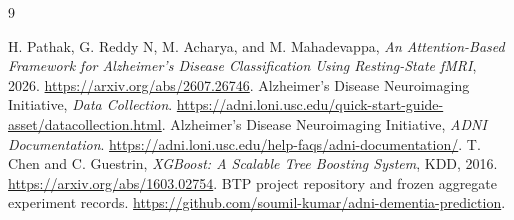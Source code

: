 \documentclass[11pt,a4paper]{article}
\begin{document}
\begin{thebibliography}{9}
 H. Pathak, G. Reddy N, M. Acharya, and M. Mahadevappa, \emph{An Attention-Based Framework for Alzheimer's Disease Classification Using Resting-State fMRI}, 2026. \url{https://arxiv.org/abs/2607.26746}.
 Alzheimer's Disease Neuroimaging Initiative, \emph{Data Collection}. \url{https://adni.loni.usc.edu/quick-start-guide-asset/datacollection.html}.
 Alzheimer's Disease Neuroimaging Initiative, \emph{ADNI Documentation}. \url{https://adni.loni.usc.edu/help-faqs/adni-documentation/}.
 T. Chen and C. Guestrin, \emph{XGBoost: A Scalable Tree Boosting System}, KDD, 2016. \url{https://arxiv.org/abs/1603.02754}.
 BTP project repository and frozen aggregate experiment records. \url{https://github.com/soumil-kumar/adni-dementia-prediction}.
\end{thebibliography}
\end{document}
